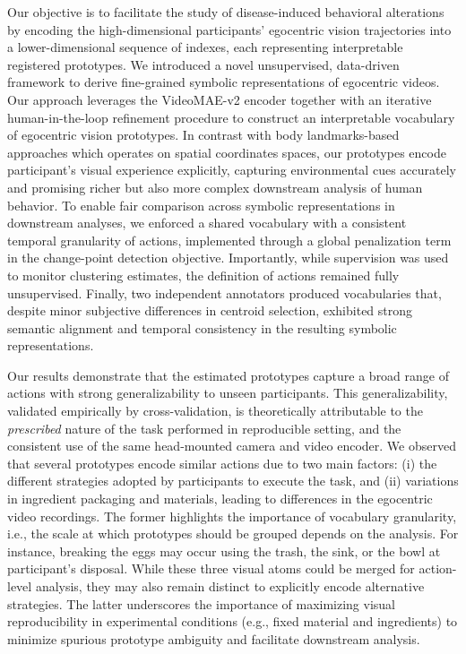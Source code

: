     Our objective is to facilitate the study of disease-induced behavioral alterations by encoding the high-dimensional participants' egocentric vision trajectories into a lower-dimensional sequence of indexes, each representing interpretable registered prototypes. 
    We introduced a novel unsupervised, data-driven framework to derive fine-grained symbolic representations of egocentric videos. Our approach leverages the VideoMAE-v2 encoder together with an iterative human-in-the-loop refinement procedure to construct an interpretable vocabulary of egocentric vision prototypes. In contrast with body landmarks-based approaches which operates on spatial coordinates spaces, our prototypes encode participant's visual experience explicitly, capturing environmental cues accurately and promising richer but also more complex downstream analysis of human behavior. To enable fair comparison across symbolic representations in downstream analyses, we enforced a shared vocabulary with a consistent temporal granularity of actions, implemented through a global penalization term in the change-point detection objective. Importantly, while supervision was used to monitor clustering estimates, the definition of actions remained fully unsupervised. Finally, two independent annotators produced vocabularies that, despite minor subjective differences in centroid selection, exhibited strong semantic alignment and temporal consistency in the resulting symbolic representations. 

    Our results demonstrate that the estimated prototypes capture a broad range of actions with strong generalizability to unseen participants. This generalizability, validated empirically by cross-validation, is theoretically attributable to the \textit{prescribed} nature of the task performed in reproducible setting, and the consistent use of the same head-mounted camera and video encoder. We observed that several prototypes encode similar actions due to two main factors: (i) the different strategies adopted by participants to execute the task, and (ii) variations in ingredient packaging and materials, leading to differences in the egocentric video recordings. 
    The former highlights the importance of vocabulary granularity, i.e., the scale at which prototypes should be grouped depends on the analysis. For instance, breaking the eggs may occur using the trash, the sink, or the bowl at participant's disposal. While these three visual atoms could be merged for action-level analysis, they may also remain distinct to explicitly encode alternative strategies. The latter underscores the importance of maximizing visual reproducibility in experimental conditions (e.g., fixed material and ingredients) to minimize spurious prototype ambiguity and facilitate downstream analysis.

